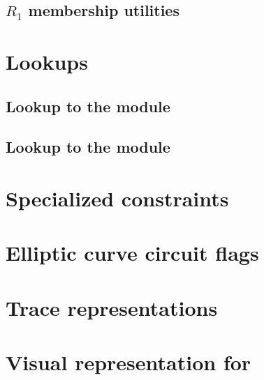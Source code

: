 \subsection{$R_1$ membership utilities}                                     \label{ec data: r1 membership utilities}                            

\section{Lookups}
\subsection{Lookup to the \wcpMod{} module}                                 \label{ec data: lookups: wcp}                                       
\subsection{Lookup to the \extMod{} module}                                 \label{ec data: lookups: ext}                                       

\section{Specialized constraints}                                           \label{ec data: specialized constraints}                            

\section{Elliptic curve circuit flags}                                      \label{ec data: circuits}                                           

\newpage
\section{Trace representations}                                             \label{ec data: trace representations}                              
\section{Visual representation for \instEcpairing{}}                        \label{ec data: visual representation of ecpairing}                 
